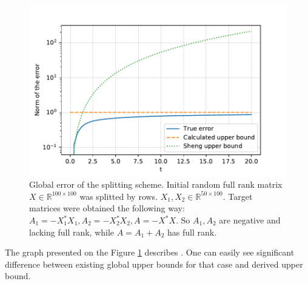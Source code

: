 \documentclass{article}
\begin{document}
\begin{figure}[ht]
\vskip 0.2in
\begin{center}
\centerline{\includegraphics[width=\columnwidth]{upper_bound_2.pdf}}
\caption{Global error of the splitting scheme. Initial random full rank matrix $X \in \mathbb{R}^{100 \times 100}$ was splitted by rows. $X_1, X_2 \in \mathbb{R}^{50 \times 100}$. Target matrices were obtained the following way: $A_1 = -X_1^*X_1, A_2 = -X_2^*X_2, A = -X^*X$. So $A_1, A_2$ are negative and lacking full rank, while $A = A_1 + A_2$ has full rank.}
\label{strang:fig:upper_bound_2}
\end{center}
\vskip -0.2in
\end{figure}


The graph presented on the Figure \ref{strang:fig:upper_bound_2} describes . One can easily see significant difference between existing global upper bounds for that case \cite{sheng1994global} and derived upper bound.
\end{document}
